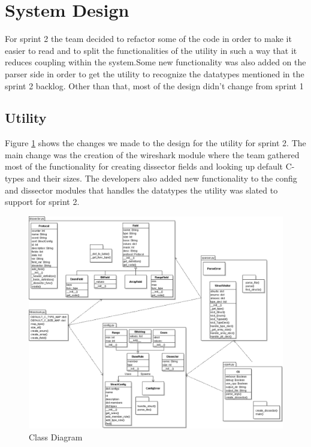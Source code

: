 \section{System Design}
For sprint 2 the team decided to refactor some of the code in order to make it easier to read and to split the functionalities of the utility in such a way that it reduces coupling within the system.Some new functionality was also added on the parser side in order to get the utility to recognize the datatypes mentioned in the sprint 2 backlog. Other than that, most of the design didn't change from sprint 1

\subsection{Utility}
Figure \ref{fig:sp2_class} shows the changes we made to the design for the utility for sprint 2. The main change was the creation of the wireshark module where the team gathered most of the functionality for creating dissector fields and looking up default C-types and their sizes. The developers also added new functionality to the config and dissector modules that handles the datatypes the utility was slated to support for sprint 2.
\begin{figure}[htb]
	\center
	\includegraphics[width=\textwidth]{./sprints/img/class_diagram_s2}
	\caption{Class Diagram\label{fig:sp2_class}}
\end{figure}




